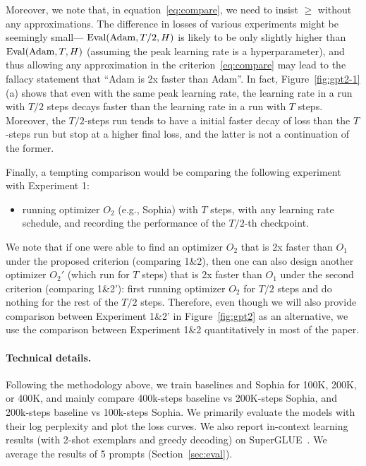 Moreover, we note that, in equation~\eqref{eq:compare}, we need to insist $\ge$ without any approximations. The difference in losses of various experiments might be seemingly small--- $\textup{Eval}(\textup{Adam}, T/2, H)$ is likely to be only slightly higher than $\textup{Eval}(\textup{Adam}, T, H)$ (assuming the peak learning rate is a hyperparameter), and thus allowing any approximation in the criterion~\eqref{eq:compare} may lead to the fallacy statement that ``Adam is 2x faster than Adam''. In fact, Figure~\ref{fig:gpt2-1} (a) shows that even with the same peak learning rate, the learning rate in a run with $T/2$ steps decays faster than the learning rate in a run with $T$ steps. Moreover, the $T/2$-steps run tends to have a initial faster decay of loss than the $T$-steps run but stop at a higher final loss, and the latter is not a continuation of the former.  

Finally, a tempting comparison would be comparing the following experiment with Experiment 1:
\begin{itemize}
    \item[2'.] running optimizer $O_2$ (e.g., Sophia) with $T$ steps, with any learning rate schedule, and recording the performance of the $T/2$-th checkpoint. 
\end{itemize}

We note that if one were able to find an optimizer $O_2$ that is 2x faster than $O_1$ under the proposed criterion (comparing 1\&2), then one can also design another optimizer $O_2'$ (which run for $T$ steps) that is 2x faster than $O_1$ under the second criterion (comparing 1\&2'): first running optimizer $O_2$ for $T/2$ steps and do nothing for the rest of the $T/2$ steps. 
Therefore, even though we will also provide comparison between Experiment 1\&2' in Figure~\ref{fig:gpt2} as an alternative, we use the comparison between Experiment 1\&2 quantitatively in most of the paper. 


\paragraph{Technical details.} Following the methodology above, we train baselines and Sophia for 100K, 200K, or 400K, and mainly compare 400k-steps baseline vs 200K-steps Sophia, and 200k-steps baseline vs 100k-steps Sophia. 
We primarily evaluate the models with their log perplexity and plot the loss curves. We also report in-context learning results (with 2-shot exemplars and greedy decoding) on SuperGLUE~\citep{wang2019superglue}. We average the results of 5 prompts (Section~\ref{sec:eval}).


